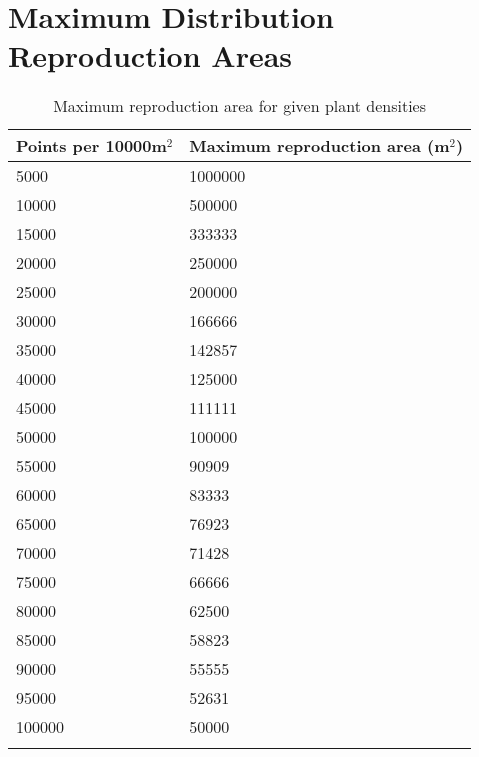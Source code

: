 \chapter{Maximum Distribution Reproduction Areas} \label{AppendixC}

\begin{longtable}{|p{7cm}|p{8cm}|}
		\hline
		\textbf{Points per 10000m$^{2}$} & \textbf{Maximum reproduction area (m$^{2}$)}\\
		\hline
		5000	  &  1000000\\
		\hline
		10000	  &  500000\\
		\hline
		15000 &	333333\\
		\hline
		20000 &	250000\\
		\hline
		25000 &	200000\\
		\hline
		30000 &	166666\\
		\hline
		35000 &	142857\\
		\hline
		40000 &	125000\\
		\hline
		45000 &	111111\\
		\hline
		50000 &	100000\\
		\hline
		55000 &	90909\\
		\hline
		60000 &	83333\\
		\hline
		65000 &	76923\\
		\hline
		70000 &	71428\\
		\hline
		75000 &	66666\\
		\hline
		80000 &	62500\\
		\hline
		85000 &	58823\\
		\hline
		90000 &	55555\\
		\hline
		95000 &	52631\\
		\hline
		100000 & 50000\\
		\hline
		\caption{Maximum reproduction area for given plant densities}
	  \label{tab:maximum_reproduction_areas}
\end{longtable}